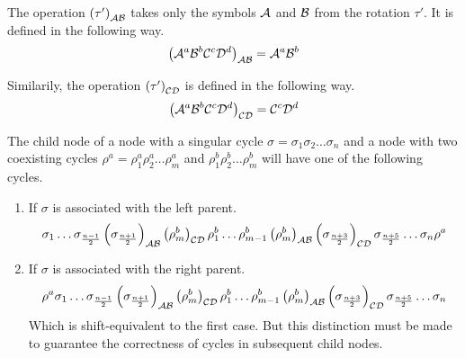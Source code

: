 \begin{definition}
	The operation $\left(\tau'\right)_{\mathcal{A}\mathcal{B}}$ takes only the symbols $\mathcal{A}$ and $\mathcal{B}$ from the rotation $\tau'$.
	It is defined in the following way.
	\begin{align}
		\left(\mathcal{A}^a\mathcal{B}^b\mathcal{C}^c\mathcal{D}^d\right)_{\mathcal{A}\mathcal{B}} = \mathcal{A}^a\mathcal{B}^b
	\end{align}

	Similarily, the operation $\left(\tau'\right)_{\mathcal{C}\mathcal{D}}$ is defined in the following way.
	\begin{align}
		\left(\mathcal{A}^a\mathcal{B}^b\mathcal{C}^c\mathcal{D}^d\right)_{\mathcal{C}\mathcal{D}} = \mathcal{C}^c\mathcal{D}^d
	\end{align}
\end{definition}

\begin{theorem}
	The child node of a node with a singular cycle $\sigma = \sigma_1\sigma_2 \dots \sigma_n$ and a node with two coexisting cycles $\rho^a = \rho^a_1\rho^a_2 \dots \rho^a_m$ and $\rho^b_1\rho^b_2 \dots \rho^b_m$ will have one of the following cycles.
	\begin{enumerate}
		\item If $\sigma$ is associated with the left parent.
		      \begin{align*}
			      \sigma_1 \dots \sigma_{\frac{n-1}{2}} \left(\sigma_{\frac{n+1}{2}}\right)_{\mathcal{A}\mathcal{B}}
			      \left(\rho^b_m\right)_{\mathcal{C}\mathcal{D}} \rho^b_1 \dots \rho^b_{m-1} \left(\rho^b_m\right)_{\mathcal{A}\mathcal{B}}
			      \left(\sigma_{\frac{n+3}{2}}\right)_{\mathcal{C}\mathcal{D}} \sigma_{\frac{n+5}{2}} \dots \sigma_n
			      \rho^a
		      \end{align*}
		\item If $\sigma$ is associated with the right parent.
		      \begin{align*}
			      \rho^a
			      \sigma_1 \dots \sigma_{\frac{n-1}{2}} \left(\sigma_{\frac{n+1}{2}}\right)_{\mathcal{A}\mathcal{B}}
			      \left(\rho^b_m\right)_{\mathcal{C}\mathcal{D}} \rho^b_1 \dots \rho^b_{m-1} \left(\rho^b_m\right)_{\mathcal{A}\mathcal{B}}
			      \left(\sigma_{\frac{n+3}{2}}\right)_{\mathcal{C}\mathcal{D}} \sigma_{\frac{n+5}{2}} \dots \sigma_n
		      \end{align*}
		      Which is shift-equivalent to the first case.
		      But this distinction must be made to guarantee the correctness of cycles in subsequent child nodes.
	\end{enumerate}
\end{theorem}

